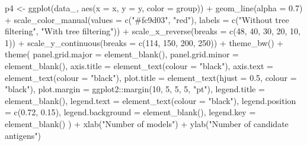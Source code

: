 \documentclass[
  11pt,
  oneside]{book}
\newenvironment{Shaded}{\begin{snugshade}}{\end{snugshade}}
\newcommand{\AttributeTok}[1]{\textcolor[rgb]{0.77,0.63,0.00}{#1}}
\newcommand{\DecValTok}[1]{\textcolor[rgb]{0.00,0.00,0.81}{#1}}
\newcommand{\FloatTok}[1]{\textcolor[rgb]{0.00,0.00,0.81}{#1}}
\newcommand{\FunctionTok}[1]{\textcolor[rgb]{0.00,0.00,0.00}{#1}}
\newcommand{\NormalTok}[1]{#1}
\newcommand{\OtherTok}[1]{\textcolor[rgb]{0.56,0.35,0.01}{#1}}
\newcommand{\SpecialCharTok}[1]{\textcolor[rgb]{0.00,0.00,0.00}{#1}}
\newcommand{\StringTok}[1]{\textcolor[rgb]{0.31,0.60,0.02}{#1}}
\begin{document}
\begin{Shaded}
\begin{Highlighting}[]
\NormalTok{p4 }\OtherTok{\textless{}{-}} \FunctionTok{ggplot}\NormalTok{(data\_, }\FunctionTok{aes}\NormalTok{(}\AttributeTok{x =}\NormalTok{ x, }\AttributeTok{y =}\NormalTok{ y, }\AttributeTok{color =}\NormalTok{ group)) }\SpecialCharTok{+}
  \FunctionTok{geom\_line}\NormalTok{(}\AttributeTok{alpha =} \FloatTok{0.7}\NormalTok{) }\SpecialCharTok{+}
  \FunctionTok{scale\_color\_manual}\NormalTok{(}\AttributeTok{values =} \FunctionTok{c}\NormalTok{(}\StringTok{"\#fc9d03"}\NormalTok{, }\StringTok{"red"}\NormalTok{), }\AttributeTok{labels =} \FunctionTok{c}\NormalTok{(}\StringTok{"Without tree filtering"}\NormalTok{, }\StringTok{"With tree filtering"}\NormalTok{)) }\SpecialCharTok{+}
  \FunctionTok{scale\_x\_reverse}\NormalTok{(}\AttributeTok{breaks =} \FunctionTok{c}\NormalTok{(}\DecValTok{48}\NormalTok{, }\DecValTok{40}\NormalTok{, }\DecValTok{30}\NormalTok{, }\DecValTok{20}\NormalTok{, }\DecValTok{10}\NormalTok{, }\DecValTok{1}\NormalTok{)) }\SpecialCharTok{+}
  \FunctionTok{scale\_y\_continuous}\NormalTok{(}\AttributeTok{breaks =} \FunctionTok{c}\NormalTok{(}\DecValTok{114}\NormalTok{, }\DecValTok{150}\NormalTok{, }\DecValTok{200}\NormalTok{, }\DecValTok{250}\NormalTok{)) }\SpecialCharTok{+}
  \FunctionTok{theme\_bw}\NormalTok{() }\SpecialCharTok{+}
  \FunctionTok{theme}\NormalTok{(}
    \AttributeTok{panel.grid.major =} \FunctionTok{element\_blank}\NormalTok{(),}
    \AttributeTok{panel.grid.minor =} \FunctionTok{element\_blank}\NormalTok{(),}
    \AttributeTok{axis.title =} \FunctionTok{element\_text}\NormalTok{(}\AttributeTok{colour =} \StringTok{"black"}\NormalTok{),}
    \AttributeTok{axis.text =} \FunctionTok{element\_text}\NormalTok{(}\AttributeTok{colour =} \StringTok{"black"}\NormalTok{),}
    \AttributeTok{plot.title =} \FunctionTok{element\_text}\NormalTok{(}\AttributeTok{hjust =} \FloatTok{0.5}\NormalTok{, }\AttributeTok{colour =} \StringTok{"black"}\NormalTok{),}
    \AttributeTok{plot.margin =}\NormalTok{ ggplot2}\SpecialCharTok{::}\FunctionTok{margin}\NormalTok{(}\DecValTok{10}\NormalTok{, }\DecValTok{5}\NormalTok{, }\DecValTok{5}\NormalTok{, }\DecValTok{5}\NormalTok{, }\StringTok{"pt"}\NormalTok{),}
    \AttributeTok{legend.title =} \FunctionTok{element\_blank}\NormalTok{(),}
    \AttributeTok{legend.text =} \FunctionTok{element\_text}\NormalTok{(}\AttributeTok{colour =} \StringTok{"black"}\NormalTok{),}
    \AttributeTok{legend.position =} \FunctionTok{c}\NormalTok{(}\FloatTok{0.72}\NormalTok{, }\FloatTok{0.15}\NormalTok{),}
    \AttributeTok{legend.background =} \FunctionTok{element\_blank}\NormalTok{(),}
    \AttributeTok{legend.key =} \FunctionTok{element\_blank}\NormalTok{()}
\NormalTok{  ) }\SpecialCharTok{+}
  \FunctionTok{xlab}\NormalTok{(}\StringTok{"Number of models"}\NormalTok{) }\SpecialCharTok{+}
  \FunctionTok{ylab}\NormalTok{(}\StringTok{"Number of candidate antigens"}\NormalTok{)}
\end{Highlighting}
\end{Shaded}
\end{document}
